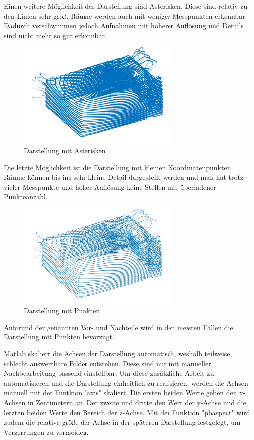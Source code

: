 Einen weitere Möglichkeit der Darstellung sind Asterisken. Diese sind relativ zu den Linien sehr groß. Räume werden auch mit weniger Messpunkten erkennbar. Dadurch verschwimmen jedoch Aufnahmen mit höherer Auflösung und Details sind nicht mehr so gut erkennbar. 


\begin{figure}[H]
	\centering
	\includegraphics[width=0.7\textwidth]{images/Auswertung/Sternchen}
	\caption{Darstellung mit Asterisken}
	\label{asterisken}
\end{figure}

Die letzte Möglichkeit ist die Darstellung mit kleinen Koordinatenpunkten. Räume können bis ins sehr kleine Detail dargestellt werden und man hat trotz vieler Messpunkte und hoher Auflösung keine Stellen mit überladener Punkteanzahl. 



\begin{figure}[H]
	\centering
	\includegraphics[width=0.7\textwidth]{images/Auswertung/Punkte}
	\caption{Darstellung mit Punkten}
	\label{punkte}
\end{figure}

Aufgrund der genannten Vor- und Nachteile wird in den meisten Fällen die Darstellung mit Punkten bevorzugt.  

Matlab skaliert die Achsen der Darstellung automatisch, weshalb teilweise schlecht auswertbare Bilder entstehen. Diese sind nur mit manueller Nachbearbeitung passend einstellbar. Um diese zusätzliche Arbeit zu automatisieren und die Darstellung einheitlich zu realisieren, werden die Achsen manuell mit der Funtkion "axis" skaliert. Die ersten beiden Werte geben den x-Achsen in Zentimetern an. Der zweite und dritte den Wert der y-Achse und die letzten beiden Werte den Bereich der z-Achse.
Mit der Funktion "pbaspect" wird zudem die relative größe der Achse in der späteren Darstellung festgelegt, um Verzerrungen zu vermeiden. 




